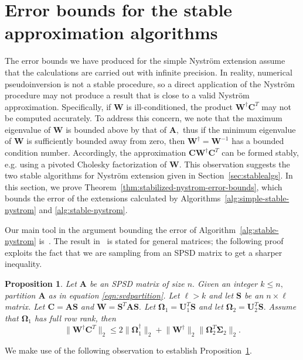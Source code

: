 \documentclass[11pt,letterpaper,twoside,reqno,nosumlimits]{amsart}
\def\pinv{\dagger}
\def\transp{T}
\newcommand{\mat}[1]{\ensuremath{\mathbf{#1}}}
\newcommand{\snorm}[1]{\ensuremath{\big\|#1\big\|_2}}
\newtheorem{prop}{Proposition}
\theoremstyle{remark}
\begin{document}
\section{Error bounds for the stable approximation algorithms}

The error bounds we have produced for the simple Nystr\"om extension assume that the calculations are carried out with infinite precision. In reality, numerical pseudoinversion is not a stable procedure, so a direct application of the Nystr\"om procedure may not produce a result that is close to a valid Nystr\"om approximation. Specifically, if $\mat{W}$ is ill-conditioned, the product $\mat{W}^\pinv \mat{C}^\transp$ may not be computed accurately. To address this concern, we note that the maximum eigenvalue of $\mat{W}$ is bounded above by that of $\mat{A},$ thus if the minimum eigenvalue of $\mat{W}$ is sufficiently bounded away from zero, then $\mat{W}^\pinv = \mat{W}^{-1}$ has a bounded condition number. Accordingly, the approximation $\mat{C} \mat{W}^\pinv \mat{C}^\transp$ can be formed stably, e.g. using a pivoted Cholesky factorization of $\mat{W}.$ This observation suggests the two stable algorithms for Nystr\"om extension given in Section~\ref{sec:stablealgs}. In this section, we prove Theorem~\ref{thm:stabilized-nystrom-error-bounds}, which bounds the error of the extensions calculated by Algorithms~\ref{alg:simple-stable-nystrom} and \ref{alg:stable-nystrom}.

Our main tool in the argument bounding the error of Algorithm~\ref{alg:stable-nystrom} is~\cite[Lemma 2.2]{CD11}. The result in~\cite[Lemma 2.2]{CD11} is stated for general matrices; the following proof exploits the fact that we are sampling from an SPSD matrix to get a sharper inequality.
\begin{prop}
 \label{prop:psd-subsampling-principle}
 Let $\mat{A}$ be an SPSD matrix of size $n.$ Given an integer $k \leq n,$ partition $\mat{A}$ as in equation \eqref{eqn:svdpartition}. Let $\ell > k$ and let $\mat{S}$ be an $n \times \ell$ matrix. Let $\mat{C} = \mat{A} \mat{S}$ and $\mat{W} = \mat{S}^\transp \mat{A} \mat{S}.$ Let $\mat{\Omega}_1 = \mat{U}_1^\transp \mat{S}$ and let $\mat{\Omega}_2 = \mat{U}_2^\transp \mat{S}.$ Assume that $\mat{\Omega}_1$ has full row rank, then
\[
 \snorm{\mat{W}^\pinv \mat{C}^\transp} \leq 2 \snorm{\mat{\Omega}_1^\pinv} + \snorm{\mat{W}^\pinv} \snorm{\mat{\Omega}_2^\transp \mat{\Sigma}_2}.
\]

\end{prop}

We make use of the following observation to establish Proposition~\ref{prop:psd-subsampling-principle}.
\end{document}
